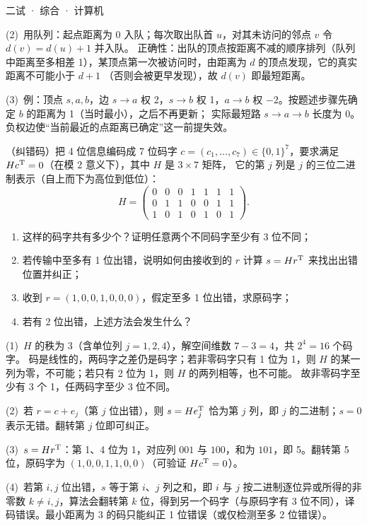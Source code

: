 \documentclass[cjk=noto, seal=first]{mojing-exam}
\begin{document}
\begin{paper}[time={建议 1.5 小时（训练设置）}, full=100]{二试 · 综合 · 计算机}
\begin{questions}
\begin{solution}
(2)~用队列：起点距离为 0 入队；每次取出队首 $u$，对其未访问的邻点 $v$ 令 $d(v)=d(u)+1$ 并入队。
正确性：出队的顶点按距离不减的顺序排列（队列中距离至多相差 1），某顶点第一次被访问时，由距离为 $d$ 的顶点发现，它的真实距离不可能小于 $d+1$
（否则会被更早发现），故 $d(v)$ 即最短距离。

(3)~例：顶点 $s,a,b$，边 $s\to a$ 权 2，$s\to b$ 权 1，$a\to b$ 权 $-2$。按题述步骤先确定 $b$ 的距离为 1（当时最小），之后不再更新；
实际最短路 $s\to a\to b$ 长度为 0。负权边使“当前最近的点距离已确定”这一前提失效。
\end{solution}

\question[25]
（纠错码）把 4 位信息编码成 7 位码字 $c=(c_1,\dots,c_7)\in\{0,1\}^7$，要求满足 $Hc^{\mathrm{T}}=0$（在模 2 意义下），其中 $H$ 是 $3\times7$ 矩阵，
它的第 $j$ 列是 $j$ 的三位二进制表示（自上而下为高位到低位）：
\[
  H=\begin{pmatrix}0&0&0&1&1&1&1\\0&1&1&0&0&1&1\\1&0&1&0&1&0&1\end{pmatrix}.
\]
\begin{enumerate}
  \item 这样的码字共有多少个？证明任意两个不同码字至少有 3 位不同；
  \item 若传输中至多有 1 位出错，说明如何由接收到的 $r$ 计算 $s=Hr^{\mathrm{T}}$ 来找出出错位置并纠正；
  \item 收到 $r=(1,0,0,1,0,0,0)$，假定至多 1 位出错，求原码字；
  \item 若有 2 位出错，上述方法会发生什么？
\end{enumerate}
\answerspace{2cm}
\begin{solution}
(1)~$H$ 的秩为 3（含单位列 $j=1,2,4$），解空间维数 $7-3=4$，共 $2^4=16$ 个码字。
码是线性的，两码字之差仍是码字；若非零码字只有 1 位为 1，则 $H$ 的某一列为零，不可能；若只有 2 位为 1，则 $H$ 的两列相等，也不可能。
故非零码字至少有 3 个 1，任两码字至少 3 位不同。

(2)~若 $r=c+e_j$（第 $j$ 位出错），则 $s=He_j^{\mathrm{T}}$ 恰为第 $j$ 列，即 $j$ 的二进制；$s=0$ 表示无错。翻转第 $j$ 位即可纠正。

(3)~$s=Hr^{\mathrm{T}}$：第 1、4 位为 1，对应列 $001$ 与 $100$，和为 $101$，即 5。翻转第 5 位，原码字为 $(1,0,0,1,1,0,0)$（可验证 $Hc^{\mathrm{T}}=0$）。

(4)~若第 $i,j$ 位出错，$s$ 等于第 $i$、$j$ 列之和，即 $i$ 与 $j$ 按二进制逐位异或所得的非零数 $k\ne i,j$，算法会翻转第 $k$ 位，得到另一个码字（与原码字有 3 位不同），译码错误。最小距离为 3 的码只能纠正 1 位错误（或仅检测至多 2 位错误）。
\end{solution}

\end{questions}
\end{paper}
\end{document}
